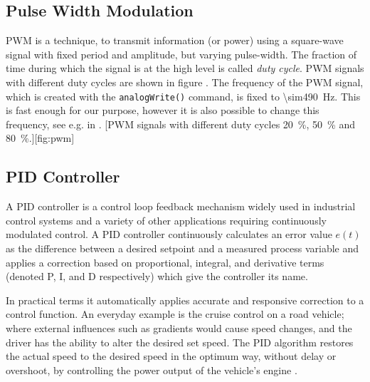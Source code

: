\subsection{Pulse Width Modulation}
\ac{PWM} is a technique, to transmit information (or power) using a square-wave signal with fixed period and amplitude, but varying pulse-width. The fraction of time during which the signal is at the high level is called \textit{duty cycle}. \ac{PWM} signals with different duty cycles are shown in figure . The frequency of the \ac{PWM} signal, which is created with the \texttt{analogWrite()} command, is fixed to \SI{\sim490}{\Hz}. This is fast enough for our purpose, however it is also possible to change this frequency, see e.g. in \cite{avrguide}.
%
[\ac{PWM} signals with different duty cycles \SI{20}{\percent}, \SI{50}{\percent} and \SI{80}{\percent}.][fig:pwm]
%
\subsection{\acs{PID} Controller}\label{sec:pid}
A \ac{PID} controller is a control loop feedback mechanism widely used in industrial control systems and a variety of other applications requiring continuously modulated control. A \ac{PID} controller continuously calculates an error value $e(t)$ as the difference between a desired setpoint and a measured process variable and applies a correction based on proportional, integral, and derivative terms (denoted P, I, and D respectively) which give the controller its name.\par
%
In practical terms it automatically applies accurate and responsive correction to a control function. An everyday example is the cruise control on a road vehicle; where external influences such as gradients would cause speed changes, and the driver has the ability to alter the desired set speed. The \ac{PID} algorithm restores the actual speed to the desired speed in the optimum way, without delay or overshoot, by controlling the power output of the vehicle's engine \cite{wiki:pid}.



